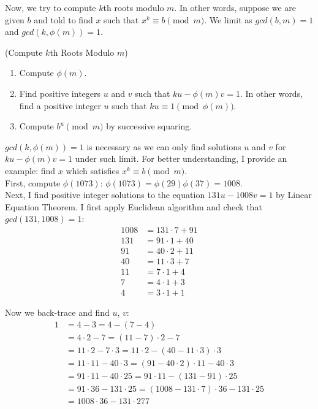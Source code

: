 \noindent
Now, we try to compute $k$th roots modulo $m$. In other words, suppose we are given $b$ and told to find $x$ such that $x^{k}\equiv b\pmod{m}$. We limit as $gcd(b, m) = 1$ and $gcd(k, \phi(m)) = 1$.

\begin{algorithm}
(Compute $k$th Roots Modulo $m$)
\begin{enumerate}
\item Compute $\phi(m)$. 
\item Find positive integers $u$ and $v$ such that $ku - \phi(m)v = 1$. In other words, find a positive integer $u$ such that $ku\equiv 1\pmod{\phi(m)}$.
\item Compute $b^{u}\pmod{m}$ by successive squaring.
\end{enumerate}
\end{algorithm}

\noindent
$gcd(k, \phi(m)) = 1$ is necessary as we can only find solutions $u$ and $v$ for $ku - \phi(m)v = 1$ under such limit. For better understanding, I provide an example: find $x$ which satisfies $x^{k}\equiv b\pmod{m}$. \\
First, compute $\phi(1073)$: $\phi(1073) = \phi(29)\phi(37) = 1008$. \\
Next, I find positive integer solutions to the equation $131u - 1008v = 1$ by Linear Equation Theorem. I first apply Euclidean algorithm and check that $gcd(131, 1008) = 1$: \\
\begin{align*}
1008 &= 131 \cdot 7 + 91 \\
131 &= 91 \cdot 1 + 40 \\
91 &= 40 \cdot 2 + 11 \\
40 &= 11 \cdot 3 + 7 \\
11 &= 7 \cdot 1 + 4 \\
7 &= 4 \cdot 1 + 3 \\
4 &= 3 \cdot 1 + 1
\end{align*}

\noindent
Now we back-trace and find $u$, $v$:
\begin{align*}
1 &= 4 - 3 = 4 - (7 - 4) \\
&= 4\cdot 2 - 7 = (11 - 7)\cdot 2 - 7 \\
&= 11\cdot 2 - 7\cdot 3 = 11\cdot 2 - (40 - 11\cdot 3)\cdot 3 \\
&= 11 \cdot 11 - 40 \cdot 3 = (91 - 40 \cdot 2) \cdot 11 - 40 \cdot 3 \\
&= 91 \cdot 11 - 40 \cdot 25 = 91 \cdot 11 - (131 - 91) \cdot 25 \\
&= 91 \cdot 36 - 131 \cdot 25 = (1008 - 131 \cdot 7) \cdot 36 - 131 \cdot 25 \\
&= 1008 \cdot 36 - 131 \cdot 277
\end{align*}

